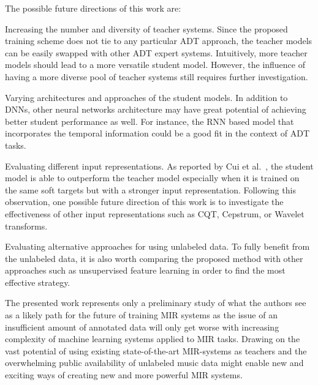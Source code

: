 \documentclass{article}
\begin{document}
The possible future directions of this work are:
\begin{inparaenum}[(i)]
    \item   Increasing the number and diversity of teacher systems. Since the proposed training scheme does not tie to any particular ADT approach, the teacher models can be easily swapped with other ADT expert systems. Intuitively, more teacher models should lead to a more versatile student model. However, the influence of having a more diverse pool of teacher systems still requires further investigation. 
    \item   Varying architectures and approaches of the student models. In addition to DNNs, other neural networks architecture may have great potential of achieving better student performance as well. For instance, the RNN based model that incorporates the temporal information could be a good fit in the context of ADT tasks. 
    \item   Evaluating different input representations. As reported by Cui et al.~\cite{Cui2017}, the student model is able to outperform the teacher model especially when it is trained on the same soft targets but with a stronger input representation. Following this observation, one possible future direction of this work is to investigate the effectiveness of other input representations such as CQT, Cepstrum, or Wavelet transforms. 
    \item   Evaluating alternative approaches for using unlabeled data. To fully benefit from the unlabeled data, it is also worth comparing the proposed method with other approaches such as unsupervised feature learning \cite{Raina2007a} in order to find the most effective strategy. 
\end{inparaenum}

The presented work represents only a preliminary study of what the authors see as a likely path for the future of training MIR systems as the issue of an insufficient amount of annotated data will only get worse with increasing complexity of machine learning systems applied to MIR tasks. Drawing on the vast potential of using existing state-of-the-art MIR-systems as teachers and the overwhelming public availability of unlabeled music data might enable new and exciting ways of creating new and more powerful MIR systems. %


\end{document}
